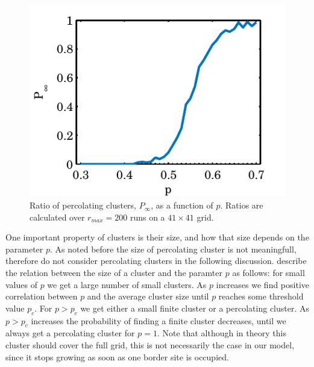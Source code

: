 \begin{figure}%
	\centering
	\includegraphics[width=\columnwidth]{./img/assignment_a_p_infinite_ratio_p.pdf}
	\caption{Ratio of percolating clusters, $P_\infty$, as a function of $p$. Ratios are calculated over $r_{max} = 200$ runs on a $41 \times 41$ grid.}
	\label{fig:experiment:prob:p_inf_ratio}
\end{figure}



One important property of clusters is their size, and how that size depends on the parameter $p$. As noted before the size of percolating cluster is not meaningfull, therefore do not consider percolating clusters in the following discussion. \textcite{kenzel1997physics} describe the relation between the size of a cluster and the paramter $p$ as follows: for small values of $p$ we get a large number of small clusters. As $p$ increases we find positive correlation between $p$ and the average cluster size until $p$ reaches some threshold value $p_c$. For $p > p_c$ we get either a small finite cluster or a percolating cluster. As $p > p_c$ increases the probability of finding a finite cluster decreases, until we always get a percolating cluster for $p =1 $. Note that although in theory this cluster should cover the full grid, this is not necessarily the case in our model, since it stops growing as soon as one border site is occupied.\\

